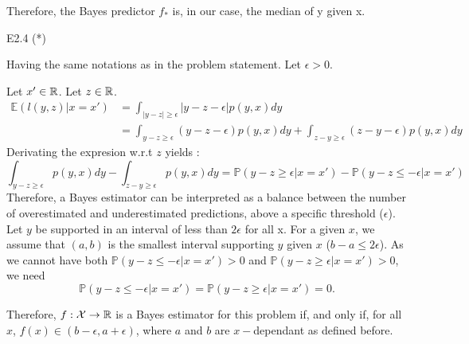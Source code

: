 \begin{questions}
\begin{solution}
    Therefore, the Bayes predictor $f_*$ is, in our case, the median of y given x.
\end{solution}

\question E2.4 (*)

\begin{solution}
Having the same notations as in the problem statement. Let $\epsilon > 0$.

    Let $x' \in \mathbb{R}$. Let $z \in \mathbb{R}$.
    $$
    \begin{aligned}
        \mathbb{E}(l(y,z)|x=x') &= \int_{|y-z|\geq\epsilon}|y-z-\epsilon|p(y,x)dy \\
        &= \int_{y-z \geq \epsilon}(y-z-\epsilon)p(y,x)dy + \int_{z-y \geq \epsilon}(z-y-\epsilon)p(y,x)dy
    \end{aligned}
    $$
    Derivating the expresion w.r.t $z$ yields : 
    $$
    \int_{y-z \geq \epsilon}p(y,x)dy - \int_{z-y \geq \epsilon}p(y,x)dy = \mathbb{P}(y-z \geq \epsilon | x=x') - \mathbb{P}(y-z \leq -\epsilon | x=x')
    $$
    Therefore, a Bayes estimator can be interpreted as a balance between the number of overestimated and underestimated predictions, above a specific threshold ($\epsilon$).
    \bigbreak
    Let $y$ be supported in an interval of less than $2 \epsilon$ for all x. For a given $x$, we assume that $(a, b)$ is the smallest interval supporting $y$ given $x$ ($b-a \leq 2\epsilon$). As we cannot have both $\mathbb{P}(y-z \leq -\epsilon | x=x') > 0$ and $\mathbb{P}(y-z \geq \epsilon | x=x') > 0$, we need $$\mathbb{P}(y-z \leq -\epsilon | x=x') =\mathbb{P}(y-z \geq \epsilon | x=x') = 0.$$

    Therefore, $f : \mathcal{X} \rightarrow \mathbb{R}$ is a Bayes estimator for this problem if, and only if, for all $x$, $f(x) \in (b-\epsilon, a+\epsilon)$, where $a$ and $b$ are $x-$dependant as defined before.
\end{solution}
\end{questions}
